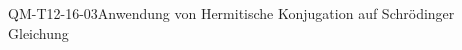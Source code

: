 
\begin{CONC}{QM-T12-16-03}{Anwendung von Hermitische Konjugation auf Schrödinger Gleichung}
\end{CONC}
